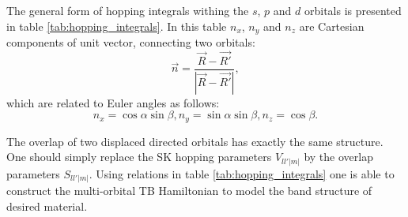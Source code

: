 The general form of hopping integrals withing the $s$, $p$ and $d$ orbitals is presented in table \ref{tab:hopping_integrals}. In this table $n_x$, $n_y$ and $n_z$ are Cartesian components of unit vector, connecting two orbitals:
\begin{equation}
	\vec{n} = \frac{\vec{R} - \vec{R'}}{|\vec{R} - \vec{R'}|},
\end{equation}
which are related to Euler angles as follows:
\begin{equation}
	n_x =\cos{\alpha} \sin{\beta}, n_y = \sin{\alpha} \sin{\beta}, n_z = \cos{\beta}. 
\end{equation}

The overlap of two displaced directed orbitals has exactly the same structure. One should simply replace the SK hopping parameters $V_{l l' |m|}$ by the overlap parameters $S_{l l' |m|}$. Using relations in table \ref{tab:hopping_integrals} one is able to construct the multi-orbital TB Hamiltonian to model the band structure of desired material.

